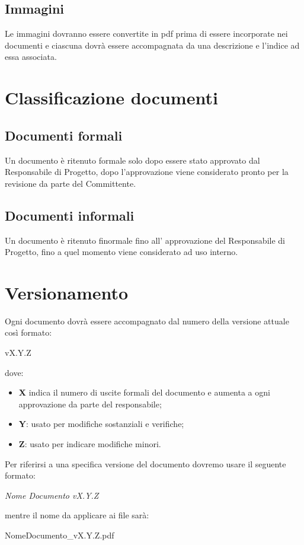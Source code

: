 \documentclass[a4paper]{report}
\begin{document}
	\subsection{Immagini}
	Le immagini dovranno essere convertite in pdf prima di essere incorporate nei documenti e ciascuna dovrà essere accompagnata da una descrizione e l'indice ad essa associata.  
	
	
	\section{Classificazione documenti}
	
	\subsection{Documenti formali}
	Un documento è ritenuto formale solo dopo essere stato approvato dal Responsabile di Progetto, dopo l'approvazione viene considerato pronto per la revisione da parte del Committente.
	\subsection{Documenti informali}
	Un documento è ritenuto finormale fino all' approvazione del Responsabile di Progetto, fino a quel momento viene considerato ad uso interno. 
	
	\section{Versionamento}
	Ogni documento dovrà essere accompagnato dal numero della versione attuale così formato:
	\begin{center}
		vX.Y.Z
	\end{center}
	dove:
	\begin{itemize}
		\item \textbf{X} indica il numero di uscite formali del documento e  aumenta a ogni approvazione da parte del responsabile;
		\item \textbf{Y}: usato per modifiche sostanziali e verifiche;
		\item \textbf{Z}: usato per indicare modifiche minori. 
	\end{itemize}
	Per riferirsi a una specifica versione del documento dovremo usare il seguente formato:\\
	\begin{center}
		\textit{Nome Documento vX.Y.Z}
	\end{center}
	mentre il nome da applicare ai file sarà:
	\begin{center}
		NomeDocumento\_vX.Y.Z.pdf
	\end{center}
\end{document}
